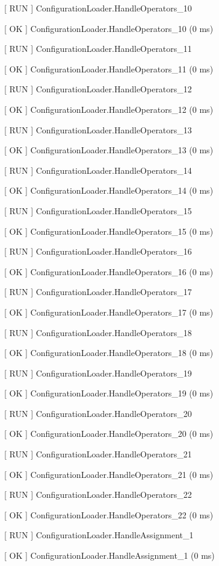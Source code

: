 \documentclass[a4paper,11pt,twoside,pdftex,draft]{article}
\begin{document}
{[} RUN {]} ConfigurationLoader.HandleOperators\_10

{[} OK {]} ConfigurationLoader.HandleOperators\_10 (0 ms)

{[} RUN {]} ConfigurationLoader.HandleOperators\_11

{[} OK {]} ConfigurationLoader.HandleOperators\_11 (0 ms)

{[} RUN {]} ConfigurationLoader.HandleOperators\_12

{[} OK {]} ConfigurationLoader.HandleOperators\_12 (0 ms)

{[} RUN {]} ConfigurationLoader.HandleOperators\_13

{[} OK {]} ConfigurationLoader.HandleOperators\_13 (0 ms)

{[} RUN {]} ConfigurationLoader.HandleOperators\_14

{[} OK {]} ConfigurationLoader.HandleOperators\_14 (0 ms)

{[} RUN {]} ConfigurationLoader.HandleOperators\_15

{[} OK {]} ConfigurationLoader.HandleOperators\_15 (0 ms)

{[} RUN {]} ConfigurationLoader.HandleOperators\_16

{[} OK {]} ConfigurationLoader.HandleOperators\_16 (0 ms)

{[} RUN {]} ConfigurationLoader.HandleOperators\_17

{[} OK {]} ConfigurationLoader.HandleOperators\_17 (0 ms)

{[} RUN {]} ConfigurationLoader.HandleOperators\_18

{[} OK {]} ConfigurationLoader.HandleOperators\_18 (0 ms)

{[} RUN {]} ConfigurationLoader.HandleOperators\_19

{[} OK {]} ConfigurationLoader.HandleOperators\_19 (0 ms)

{[} RUN {]} ConfigurationLoader.HandleOperators\_20

{[} OK {]} ConfigurationLoader.HandleOperators\_20 (0 ms)

{[} RUN {]} ConfigurationLoader.HandleOperators\_21

{[} OK {]} ConfigurationLoader.HandleOperators\_21 (0 ms)

{[} RUN {]} ConfigurationLoader.HandleOperators\_22

{[} OK {]} ConfigurationLoader.HandleOperators\_22 (0 ms)

{[} RUN {]} ConfigurationLoader.HandleAssignment\_1

{[} OK {]} ConfigurationLoader.HandleAssignment\_1 (0 ms)
\end{document}
